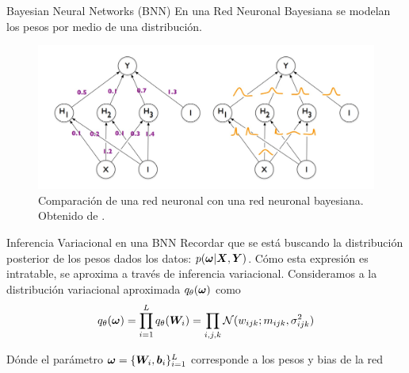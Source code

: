\begin{frame}{Bayesian Neural Networks (BNN)}
    En una Red Neuronal Bayesiana se modelan los pesos por medio de una distribución. 
    \begin{figure}[H]
        \centering
        \includegraphics[width=\linewidth]{presentaciones/img/comp_NN_con_BNN.jpg}
        \caption{Comparación de una red neuronal con una red neuronal bayesiana. Obtenido de \cite{blundell2015weight}.}
        \label{fig:comp_NN_con_BNN}
    \end{figure}
\end{frame}

\begin{frame}{Inferencia Variacional en una BNN}
    Recordar que se está buscando la distribución posterior de los pesos dados los datos: $p({\bm{\omega}} | {\bm{X}}, {\bm{Y}})$. Cómo esta expresión es intratable, se aproxima a través de inferencia variacional. Consideramos a la distribución variacional aproximada $q_\theta({\bm{\omega}})$ como
    \begin{equation}
        q_\theta({\bm{\omega}}) = \prod_{i=1}^{L} q_\theta ({\bm{W}}_i) = \prod_{i, j, k} \mathcal{N}(w_{ijk}; m_{ijk}, \sigma^2_{ijk})
    \end{equation}
    
    Dónde el parámetro ${\bm{\omega}} = \{{\bm{W}}_i, {\bm{b}}_i\}_{i=1}^{L}$ corresponde a los pesos y bias de la red
\end{frame}

